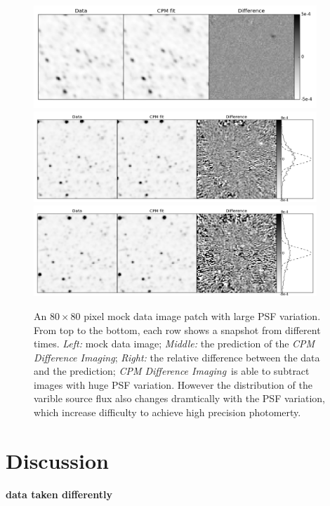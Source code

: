 \documentclass[12pt, preprint]{aastex}
\newcommand{\project}[1]{\textsl{#1}}
\newcommand{\cpmdiff}{\project{CPM Difference Imaging}}
\newcommand{\todo}[1]{\textbf{#1}}
\begin{document}
\begin{figure}[p]
\begin{center}
\includegraphics[width=0.95\textwidth]{f7a}
\includegraphics[width=0.95\textwidth]{f7b}
\includegraphics[width=0.95\textwidth]{f7c}
\end{center}
\caption{
  \label{large_prf}
  An $80\times 80$ pixel mock data image patch with large PSF variation. 
  From top to the bottom, each row shows a snapshot from different times.
  \emph{Left:} mock data image;
  \emph{Middle:} the prediction of the \cpmdiff;
  \emph{Right:} the relative difference between the data and the prediction;  
  \cpmdiff\ is able to subtract images with huge PSF variation. 
  However the distribution of the varible source flux also changes dramtically with the PSF variation, which increase difficulty to achieve high precision photomerty.
}
\end{figure}





\section{Discussion}
\todo{data taken differently}

\clearpage

\clearpage
\end{document}
